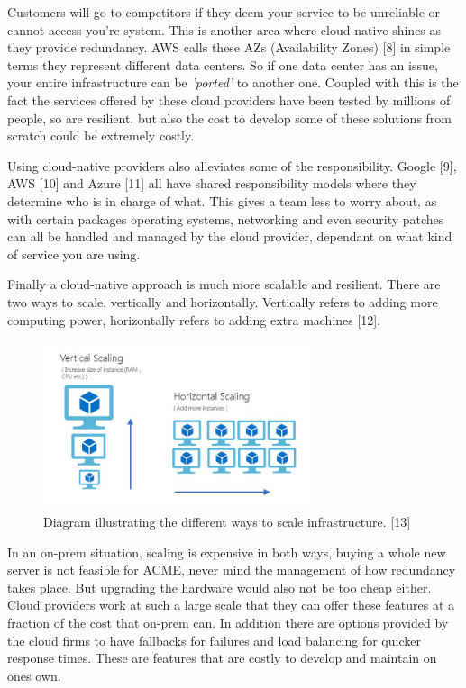  Customers will go to competitors if they deem your service to be unreliable or cannot access you're system. This is another area where cloud-native shines 
  as they provide redundancy. AWS calls these AZs (Availability Zones) [8] in simple terms they represent different data centers. So if one data center 
  has an issue, your entire infrastructure can be \textit{'ported'} to another one. Coupled with this is the fact the services offered by these cloud
  providers have been tested by millions of people, so are resilient, but also the cost to develop some of these solutions from scratch could be
  extremely costly.

  Using cloud-native providers also alleviates some of the responsibility. Google [9], AWS [10] and Azure [11] all have shared responsibility models where 
  they determine who is in charge of what. This gives a team less to worry about, as with certain packages operating systems, networking and even 
  security patches can all be handled and managed by the cloud provider, dependant on what kind of service you are using.

  Finally a cloud-native approach is much more scalable and resilient. There are two ways to scale, vertically and horizontally.
  Vertically refers to adding more computing power, horizontally refers to adding extra machines [12].

  \begin{figure}[H]
    \centering
    \includegraphics[width=8cm]{assets/scalingOptions.jpg}
    \caption{Diagram illustrating the different ways to scale infrastructure. [13]}
    \label{fig:scalingOptions}
  \end{figure}

  In an on-prem situation, scaling is expensive in both ways, buying a whole new server is not feasible for ACME, never mind the management of how
  redundancy takes place. But upgrading the hardware would also not be too cheap either. Cloud providers work at such a large scale that they can offer
  these features at a fraction of the cost that on-prem can. In addition there are options provided by the cloud firms to have fallbacks for failures and 
  load balancing for quicker response times. These are features that are costly to develop and maintain on ones own. 

